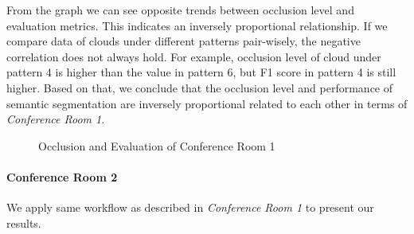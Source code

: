 \documentclass[11pt, a4paper,oneside,chapterprefix=false]{scrbook}
\begin{document}
From the graph we can see opposite trends between occlusion level and evaluation metrics. This indicates an inversely proportional relationship. If we compare data of clouds under different patterns pair-wisely, the negative correlation does not always hold. For example, occlusion level of cloud under pattern 4 is higher than the value in pattern 6, but F1 score in pattern 4 is still higher. Based on that, we conclude that the occlusion level and performance of semantic segmentation are inversely proportional related to each other in terms of \emph{Conference Room 1}.

\begin{figure}[H]
    \centering
    \caption{Occlusion and Evaluation of Conference Room 1}
    \label{fig:evaluation metrics of conference room 1}
\end{figure}

\vspace{30pt}

\paragraph{Conference Room 2}

We apply same workflow as described in \emph{Conference Room 1} to present our results.
\end{document}
